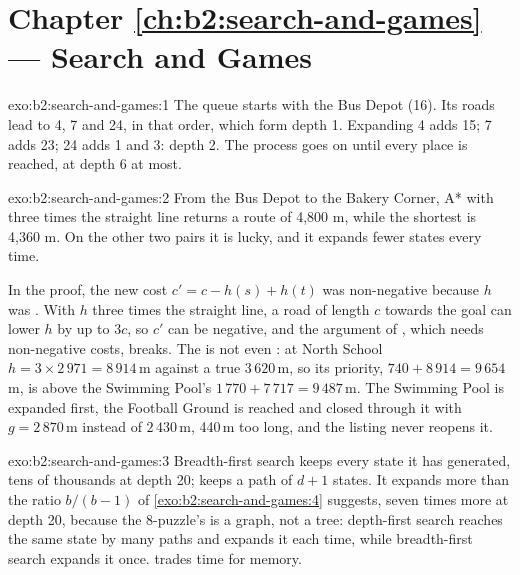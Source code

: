 \section*{Chapter \ref{ch:b2:search-and-games} --- Search and Games}

\begin{solution}{exo:b2:search-and-games:1}
The queue starts with the Bus Depot (16). Its roads lead to 4, 7 and 24, in that order, which form depth 1. Expanding 4
adds 15; 7 adds 23; 24 adds 1 and 3: depth 2. The process goes on until every place is reached, at depth 6 at most.

\end{solution}

\begin{solution}{exo:b2:search-and-games:2}
From the Bus Depot to the Bakery Corner, A* with three times the straight line returns a route of 4,800 m, while the
shortest is 4,360 m. On the other two pairs it is lucky, and it expands fewer states every time.


In the proof, the new cost $c' = c - h(s) + h(t)$ was non-negative because $h$ was . With $h$ three times the
straight line, a road of length $c$ towards the goal can lower $h$ by up to $3c$, so $c'$ can be negative, and the
argument of , which needs non-negative costs, breaks. The  is not even : at North School
$h = 3 \times 2\,971 = 8\,914$\,m against a true $3\,620$\,m, so its priority, $740 + 8\,914 = 9\,654$\,m, is above the
Swimming Pool's $1\,770 + 7\,717 = 9\,487$\,m. The Swimming Pool is expanded first, the Football Ground is reached and
closed through it with $g = 2\,870$\,m instead of $2\,430$\,m, 440\,m too long, and the listing never reopens it.
\end{solution}

\begin{solution}{exo:b2:search-and-games:3}
Breadth-first search keeps every state it has generated, tens of thousands at depth 20;  keeps a path of
$d + 1$ states. It expands more than the ratio $b/(b - 1)$ of \cref{exo:b2:search-and-games:4} suggests, seven times
more at depth 20, because the 8-puzzle's  is a graph, not a tree: depth-first search reaches the same state by
many paths and expands it each time, while breadth-first search expands it once.  trades time for
memory.
\end{solution}

